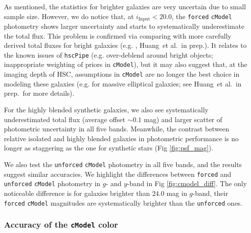 \documentclass[useamsfonts]{pasj01}
\def\etal{{\ et al.~}}
\def\hscpipe{\texttt{hscPipe}}
\def\cmodel{\texttt{cModel}}
\def\forced{\texttt{forced}}
\def\unforced{\texttt{unforced}}
\begin{document}
    As mentioned, the statistics for brighter galaxies are very uncertain due to 
    small sample size. 
    However, we do notice that, at $i_{\mathrm{Input}}<20.0$, the \forced{} 
    \cmodel{} photometry shows larger uncertainty and starts to systematically 
    underestimate the total flux.  
    This problem is confirmed via comparing with more carefully derived total fluxes 
    for bright galaxies (e.g. \citealt{HSCDR1}, Huang\etal in prep.). 
    It relates to the known issues of \hscpipe{} (e.g. over-deblend around bright 
    objects; inappropriate weighting of priors in \cmodel{}), but it may also suggest
    that, at the imaging depth of HSC, assumptions in \cmodel{} are no longer the 
    best choice in modeling these galaxies (e.g. for massive elliptical galaxies; 
    see Huang\etal in prep.~for more details). 
    
    For the highly blended synthetic galaxies, we also see systematically 
    underestimated total flux (average offset ${\sim}0.1$ mag) and larger scatter 
    of photometric uncertainty in all five bands.  
    Meanwhile, the contrast between relative isolated and highly blended galaxies 
    in photometric performance is no longer as staggering as the one for synthetic
    stars (Fig \ref{fig:psf_mag}).
    
    We also test the \unforced{} \cmodel{} photometry in all five bands, and the 
    results suggest similar accuracies.
    We highlight the differences between \forced{} and \unforced{} \cmodel{} 
    photometry in $g$- and $y$-band in Fig \ref{fig:cmodel_diff}.
    The only noticeable difference is for galaxies brighter than $24.0$ mag in 
    $g$-band, their \forced{} \cmodel{} magnitudes are systematically brighter than 
    the \unforced{} ones. 
    
\subsubsection{Accuracy of the \cmodel{} color}
\end{document}
